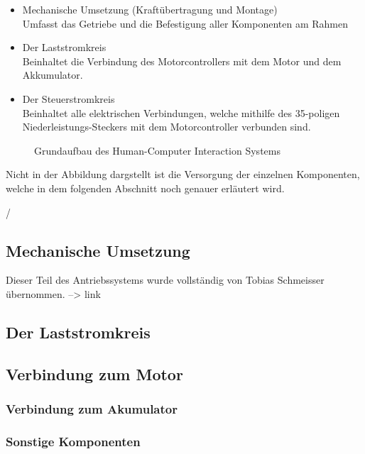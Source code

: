\begin{itemize}
	\item Mechanische Umsetzung (Kraftübertragung und Montage) 
	\\ Umfasst das Getriebe und die Befestigung aller Komponenten am Rahmen
	\item Der Laststromkreis
	\\ Beinhaltet die Verbindung des Motorcontrollers mit dem Motor und dem Akkumulator.
	\item Der Steuerstromkreis
	\\ Beinhaltet alle elektrischen Verbindungen, welche mithilfe des 35-poligen
	\\ Niederleistungs-Steckers mit dem Motorcontroller verbunden sind.
\end{itemize}

\begin{figure}[H]
	\begin{center}
		\caption{Grundaufbau des Human-Computer Interaction Systems}
	\end{center}
\end{figure}

Nicht in der Abbildung dargstellt ist die Versorgung der einzelnen Komponenten, welche in dem folgenden Abschnitt noch genauer erläutert wird.


/%

\newpage

\subsection{Mechanische Umsetzung}
Dieser Teil des Antriebssystems wurde vollständig von Tobias Schmeisser übernommen.
--> link

\subsection{Der Laststromkreis}
\subsection{Verbindung zum Motor}
\subsubsection{Verbindung zum Akumulator}
\subsubsection{Sonstige Komponenten}

